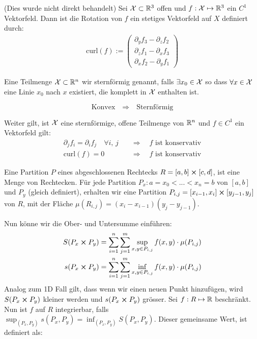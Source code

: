 (Dies wurde nicht direkt behandelt) Sei $\mathcal{X} \subset \mathbb{R}^3$ offen und $f: \mathcal{X} \mapsto \mathbb{R}^3$ ein $C^1$ Vektorfeld. 
Dann ist die Rotation von $f$ ein stetiges Vektorfeld auf $X$ definiert durch:
\begin{align*}
  \text{curl}(f) :=
  \begin{pmatrix}
    \partial_y f_3 - \partial_z f_2\\
    \partial_z f_1 - \partial_x f_3\\
    \partial_x f_2 - \partial_y f_1
  \end{pmatrix}
\end{align*}



Eine Teilmenge $\mathcal{X} \subset \mathbb{R}^n$ wir sternförmig genannt, falls $\exists x_0 \in \mathcal{X}$ so dass
$\forall x \in \mathcal{X}$ eine Linie $x_0$ nach $x$ existiert, die komplett in $\mathcal{X}$ enthalten ist.

$$\text{Konvex} \quad \Rightarrow \quad \text{Sternförmig}$$

Weiter gilt, ist $\mathcal{X}$ eine sternförmige, offene Teilmenge von $\mathbb{R}^n$ und $f \in C^1$ ein Vektorfeld gilt:
\begin{align*}
  \partial_j f_i = \partial_i f_j \quad \forall i,\, j \quad &\Rightarrow \quad \text{$f$ ist konservativ}\\
  \text{curl}(f) = 0 \quad &\Rightarrow \quad \text{$f$ ist konservativ}
\end{align*}



\begin{tcolorbox}
    Eine Partition $P$ eines abgeschlossenen Rechtecks $R = [a,b] \cross [c,d]$, ist eine Menge von Rechtecken. Für
    jede Partition $P_x: a = x_0 < ... < x_n = b$ von $[a,b]$ und $P_y$ (gleich definiert), erhalten wir eine Partition
    $P_{i,j} = [x_{i-1}, x_i] \cross [y_{j-1}, y_j]$ von $R$, mit der Fläche $\mu(R_{i,j}) = (x_i - x_{i-1})(y_j - y_{j-1})$.
\end{tcolorbox}

Nun könne wir die Ober- und Untersumme einführen:
\begin{align*}
    S(P_x \cross P_y) &= \sum_{i = 1}^n \sum_{j = 1}^m \sup_{x,y \in P_{i,j}} f(x,y) \cdot \mu(P_{i,j}) \\
    s(P_x \cross P_y) &= \sum_{i = 1}^n \sum_{j = 1}^m \inf_{x,y \in P_{i,j}} f(x,y) \cdot \mu(P_{i,j})
\end{align*}
Analog zum 1D Fall gilt, dass wenn wir einen neuen Punkt hinzufügen, wird  $S(P_x \cross P_y)$ kleiner werden und
$s(P_x \cross P_y)$ grösser. Sei $f: R \mapsto \mathbb{R}$ beschränkt. Nun ist $f$ auf $R$ integrierbar, falls 
$\sup_{(P_x, P_y)} s(P_x, P_y) = \inf_{(P_x, P_y)} S(P_x, P_y)$. Dieser gemeinsame Wert, ist definiert als:

